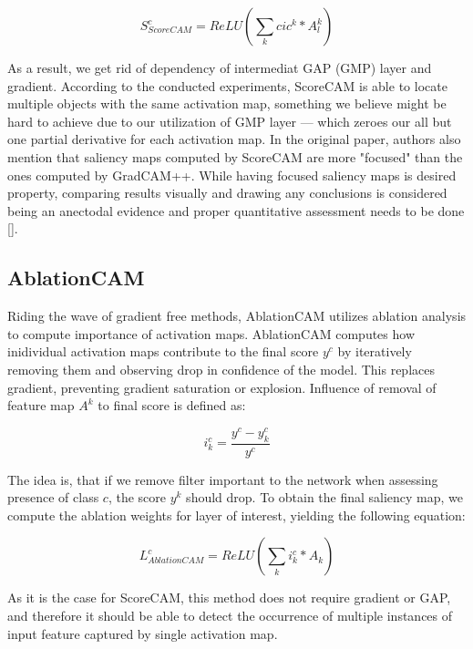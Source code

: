 \begin{equation}
    S_{ScoreCAM}^c = ReLU(\sum_k cic^k * A^k_l)
\end{equation}

As a result, we get rid of dependency of intermediat GAP (GMP) layer and gradient. According to the conducted experiments, ScoreCAM is able to locate multiple objects with the same activation map, something we believe might be hard to achieve due to our utilization of GMP layer --- which zeroes our all but one partial derivative for each activation map. In the original paper, authors also mention that saliency maps computed by ScoreCAM are more "focused" than the ones computed by GradCAM++. While having focused saliency maps is desired property, comparing results visually and drawing any conclusions is considered being an anectodal evidence and proper quantitative assessment needs to be done [].


\subsection{AblationCAM}


Riding the wave of gradient free methods, AblationCAM utilizes ablation analysis to compute importance of activation maps. AblationCAM computes how inidividual activation maps contribute to the final score $y^c$ by iteratively removing them and observing drop in confidence of the model. This replaces gradient, preventing gradient saturation or explosion. Influence of removal of feature map $A^k$ to final score is defined as:


\begin{equation}
    i^c_k = \frac{y^c - y^c_k}{y^c}
\end{equation}

The idea is, that if we remove filter important to the network when assessing presence of class $c$, the score $y^k$ should drop. To obtain the final saliency map, we compute the ablation weights for layer of interest, yielding the following equation:

\begin{equation}
    L^c_{AblationCAM} = ReLU(\sum_k i^c_k * A_k)
\end{equation}

As it is the case for ScoreCAM, this method does not require gradient or GAP, and therefore it should be able to detect the occurrence of multiple instances of input feature captured by single activation map.


